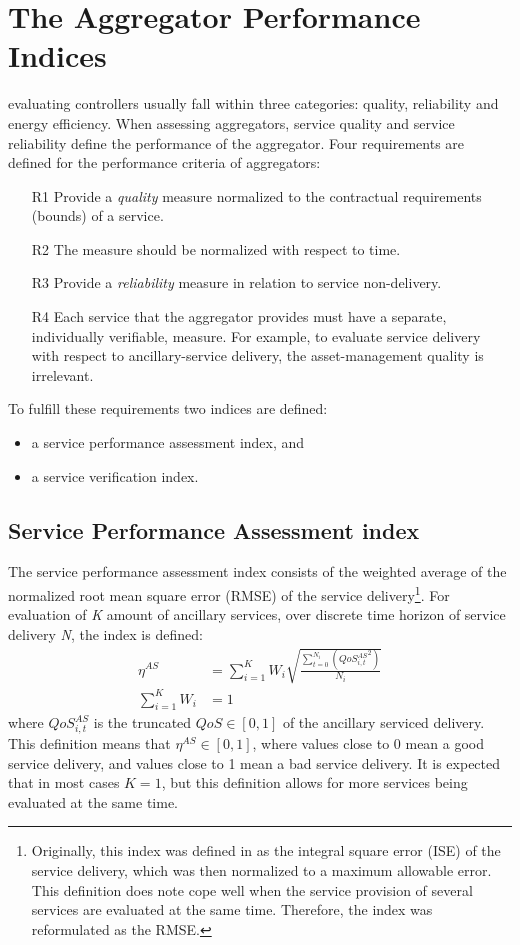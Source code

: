 \section{The Aggregator Performance Indices}
 evaluating controllers usually fall within three categories: quality, reliability and energy efficiency. When assessing aggregators, service quality and service reliability define the performance of the aggregator. Four requirements are defined for the performance criteria of aggregators:
\begin{itemize}
	\item[R1] Provide a \emph{quality} measure normalized to the contractual requirements (bounds) of a service. 
	\item[R2] The measure should be normalized with respect to time.
	\item[R3] Provide a \emph{reliability} measure in relation to service non-delivery.
	\item[R4] Each service that the aggregator provides must have a separate, individually verifiable, measure. For example, to evaluate service delivery with respect to ancillary-service delivery, the asset-management quality is irrelevant.
\end{itemize}

To fulfill these requirements two indices are defined:
\begin{itemize}
	\item a service performance assessment index, and
	\item a service verification index.
\end{itemize}

\subsection{Service Performance Assessment index}
The service performance assessment index consists of the weighted average of the normalized root mean square error (RMSE) of the service delivery\footnote{Originally, this index was defined in \cite{bondy2014performance} as the integral square error (ISE) of the service delivery, which was then normalized to a maximum allowable error. This definition does note cope well when the service provision of several services are evaluated at the same time. Therefore, the index was reformulated as the RMSE.}. For evaluation of \emph{K} amount of ancillary services, over discrete time horizon of service delivery \emph{N}, the index is defined:
\begin{align}\label{eq:MAINetaAS}
\eta^{AS} &= \sum^{K}_{i=1} W_i \sqrt{\frac{\sum^{N_i}_{t=0} \left( {QoS^{AS}_{i,t}}^{2} \right)}{N_i}}\\
\sum_{i=1}^K W_i &= 1
\end{align}
where $QoS^{AS}_{i,t}$ is the truncated $QoS \in [0,1]$ of the ancillary serviced delivery. This definition means that $\eta^{AS} \in [0,1]$, where values close to 0 mean a good service delivery, and values close to 1 mean a bad service delivery. It is expected that in most cases $K=1$, but this definition allows for more services being evaluated at the same time.

